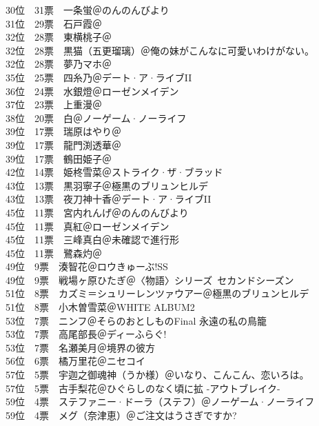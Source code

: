 {    30位　31票　一条蛍＠のんのんびより\\
    31位　29票　石戸霞＠\Saki\\
    32位　28票　東横桃子＠\Saki\\
    32位　28票　黒猫（五更瑠璃）＠俺の妹がこんなに可愛いわけがない。\\
    32位　28票　夢乃マホ＠\Saki\\
    35位　25票　四糸乃＠デート·ア·ライブII\\
    36位　24票　水銀燈＠ローゼンメイデン\\
    37位　23票　上重漫＠\Saki\\
    38位　20票　白＠ノーゲーム·ノーライフ\\
    39位　17票　瑞原はやり＠\Saki\\
    39位　17票　龍門渕透華＠\Saki\\
    39位　17票　鶴田姫子＠\Saki\\
    42位　14票　姫柊雪菜＠ストライク·ザ·ブラッド\\
    43位　13票　黒羽寧子＠極黒のブリュンヒルデ\\
    43位　13票　夜刀神十香＠デート·ア·ライブII\\
    45位　11票　宮内れんげ＠のんのんびより\\
    45位　11票　真紅＠ローゼンメイデン\\
    45位　11票　三峰真白＠未確認で進行形\\
    45位　11票　鷺森灼＠\Saki\\
    49位　9票　湊智花＠ロウきゅーぶ!SS\\
    49位　9票　戦場ヶ原ひたぎ＠〈物語〉シリーズ~セカンドシーズン\\
    51位　8票　カズミ＝シュリーレンツァウアー＠極黒のブリュンヒルデ\\
    51位　8票　小木曽雪菜＠WHITE ALBUM2\\
    53位　7票　ニンフ＠そらのおとしものFinal 永遠の私の鳥籠\\
    53位　7票　高尾部長＠ディーふらぐ!\\
    53位　7票　名瀬美月＠境界の彼方\\
    56位　6票　橘万里花＠ニセコイ\\
    57位　5票　宇迦之御魂神（うか様）＠いなり、こんこん、恋いろは。\\
    57位　5票　古手梨花＠ひぐらしのなく頃に拡 -アウトブレイク-\\
    59位　4票　ステファニー·ドーラ（ステフ）＠ノーゲーム·ノーライフ\\
    59位　4票　メグ（奈津恵）＠ご注文はうさぎですか?\\
}
